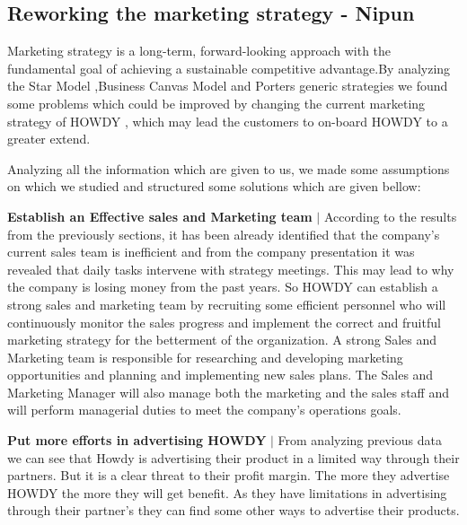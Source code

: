 
\subsection{Reworking the marketing strategy - Nipun}

Marketing strategy is a long-term, forward-looking approach with the fundamental goal of achieving a sustainable competitive advantage.By analyzing the Star Model ,Business Canvas Model and Porters generic strategies we found some problems which could be improved by changing the current marketing strategy of HOWDY , which may lead the customers to on-board HOWDY to a greater extend.

\noindent Analyzing all the information which are given to us, we made some assumptions on which we studied and structured some solutions which are given bellow:

\noindent \textbf{Establish an Effective sales and Marketing team}  $|$ According to the results from the previously sections, it has been already identified that the company’s current sales team is inefficient and from the company presentation it was revealed that daily tasks intervene with strategy meetings. This may lead to why the company is losing money from the past years. So HOWDY can establish a strong sales and marketing team by recruiting some efficient personnel who will continuously monitor the sales progress and implement the correct and fruitful marketing strategy for the betterment of the organization. A strong Sales and Marketing team is responsible for researching and developing marketing opportunities and planning and implementing new sales plans. The Sales and Marketing Manager will also manage both the marketing and the sales staff and will perform managerial duties to meet the company's operations goals.

\noindent \textbf{Put more efforts in advertising HOWDY} $|$ From analyzing previous data we can see that Howdy is advertising their product in a limited way through their partners. But it is a clear threat to their profit margin. The more they advertise HOWDY the more they will get benefit. As they have limitations in advertising through their partner’s they can find some other ways to advertise their products.

